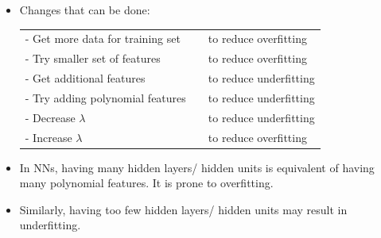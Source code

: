 \documentclass{article}
\begin{document}
\begin{itemize}
	\item Changes that can be done: \\\begin{tabular}{l c l}
	- Get more data for training set &\hspace{50pt} &to reduce overfitting\\
	- Try smaller set of features & &to reduce overfitting\\
	- Get additional features & &to reduce underfitting\\
	- Try adding polynomial features & &to reduce underfitting\\
	- Decrease $\lambda$ & &to reduce underfitting\\
	- Increase $\lambda$ & &to reduce overfitting\\
	\end{tabular}
	\item In NNs, having many hidden layers/ hidden units is equivalent of having many polynomial features. It is prone to overfitting.
	\item Similarly, having too few hidden layers/ hidden units may result in underfitting.
\end{itemize}
\end{document}
